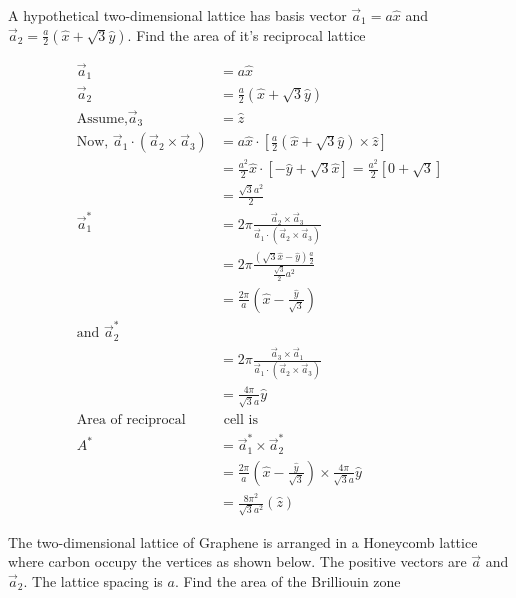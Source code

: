 \begin{exercise}
A hypothetical two-dimensional lattice has basis vector $\vec{a}_{1}=a \hat{x}$ and $\vec{a}_{2}=\frac{a}{2}(\hat{x}+\sqrt{3} \hat{y})$. Find the area of it's reciprocal lattice
\end{exercise}
\begin{answer}
	\begin{align*}
	\vec{a}_{1}&=a \hat{x}\\
	\vec{a}_{2}&=\frac{a}{2}(\hat{x}+\sqrt{3} \hat{y})\\
	\text{Assume,} \vec{a}_{3}&=\hat{z}\\
	\text{Now, } \vec{a}_{1} \cdot\left(\vec{a}_{2} \times \vec{a}_{3}\right)&=a \hat{x} \cdot\left[\frac{a}{2}(\hat{x}+\sqrt{3} \hat{y}) \times \hat{z}\right]\\&=\frac{a^{2}}{2} \hat{x} \cdot[-\hat{y}+\sqrt{3} \hat{x}]=\frac{a^{2}}{2}[0+\sqrt{3}]\\&=\frac{\sqrt{3} a^{2}}{2}\\
	\vec{a}_{1}^{*}&=2 \pi \frac{\vec{a}_{2} \times \vec{a}_{3}}{\vec{a}_{1} \cdot\left(\vec{a}_{2} \times \vec{a}_{3}\right)}\\&=2 \pi \frac{(\sqrt{3} \hat{x}-\hat{y}) \frac{a}{2}}{\frac{\sqrt{3}}{2} a^{2}}\\&=\frac{2 \pi}{a}\left(\hat{x}-\frac{\hat{y}}{\sqrt{3}}\right) \\
	\text{and } \vec{a}_{2}^{*}\\&=2 \pi \frac{\vec{a}_{3} \times \vec{a}_{1}}{\vec{a}_{1} \cdot\left(\vec{a}_{2} \times \vec{a}_{3}\right)}\\&=\frac{4 \pi}{\sqrt{3} a} \hat{y}\\
	\text{Area of reciprocal}&\text{ cell is}\\
	A^{*}&=\vec{a}_{1}^{*} \times \vec{a}_{2}^{*}\\&=\frac{2 \pi}{a}\left(\hat{x}-\frac{\hat{y}}{\sqrt{3}}\right) \times \frac{4 \pi}{\sqrt{3} a} \hat{y}\\&=\frac{8 \pi^{2}}{\sqrt{3} a^{2}}(\hat{z})
	\end{align*}
\end{answer}
\begin{exercise}
	The two-dimensional lattice of Graphene is arranged in a Honeycomb lattice where carbon occupy the vertices as shown below. The positive vectors are $\vec{a}$ and $\vec{a}_{2}$. The lattice spacing is $a$. Find the area of the Brilliouin zone
\end{exercise}
